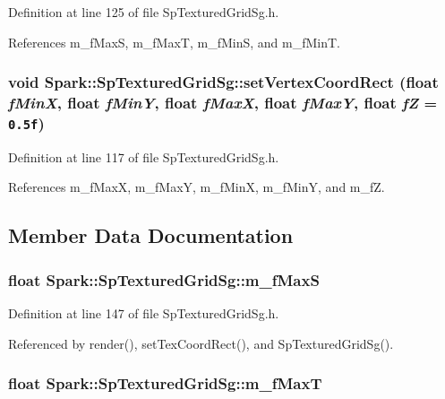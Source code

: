 Definition at line 125 of file Sp\-Textured\-Grid\-Sg.h.

References m\_\-f\-Max\-S, m\_\-f\-Max\-T, m\_\-f\-Min\-S, and m\_\-f\-Min\-T.
\subsubsection{\setlength{\rightskip}{0pt plus 5cm}void Spark::Sp\-Textured\-Grid\-Sg::set\-Vertex\-Coord\-Rect (float {\em f\-Min\-X}, float {\em f\-Min\-Y}, float {\em f\-Max\-X}, float {\em f\-Max\-Y}, float {\em f\-Z} = {\tt 0.5f})\hspace{0.3cm}{\tt  [inline]}}\label{classSpark_1_1SpTexturedGridSg_a4}


Definition at line 117 of file Sp\-Textured\-Grid\-Sg.h.

References m\_\-f\-Max\-X, m\_\-f\-Max\-Y, m\_\-f\-Min\-X, m\_\-f\-Min\-Y, and m\_\-f\-Z.

\subsection{Member Data Documentation}
\subsubsection{\setlength{\rightskip}{0pt plus 5cm}float {\bf Spark::Sp\-Textured\-Grid\-Sg::m\_\-f\-Max\-S}\hspace{0.3cm}{\tt  [protected]}}\label{classSpark_1_1SpTexturedGridSg_p8}


Definition at line 147 of file Sp\-Textured\-Grid\-Sg.h.

Referenced by render(), set\-Tex\-Coord\-Rect(), and Sp\-Textured\-Grid\-Sg().
\subsubsection{\setlength{\rightskip}{0pt plus 5cm}float {\bf Spark::Sp\-Textured\-Grid\-Sg::m\_\-f\-Max\-T}\hspace{0.3cm}{\tt  [protected]}}\label{classSpark_1_1SpTexturedGridSg_p10}



